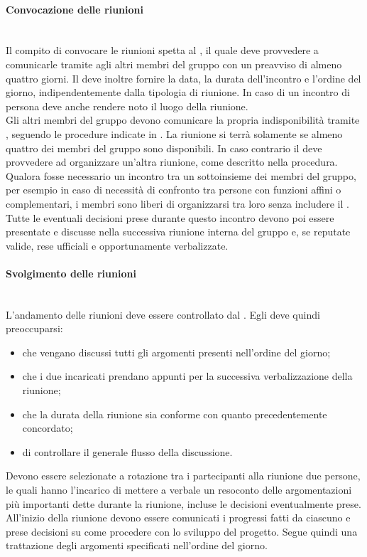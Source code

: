 \paragraph{Convocazione delle riunioni}\mbox{}\\
Il compito di convocare le riunioni spetta al \Responsabile, il quale deve provvedere a comunicarle tramite  agli altri membri del gruppo con un preavviso di almeno quattro giorni. Il \Responsabile{} deve inoltre fornire la data, la durata dell'incontro e l'ordine del giorno, indipendentemente dalla tipologia di riunione. In caso di un incontro di persona deve anche rendere noto il luogo della riunione.\\
Gli altri membri del gruppo devono comunicare la propria indisponibilità tramite , seguendo le procedure indicate in . La riunione si terrà solamente se almeno quattro dei membri del gruppo sono disponibili. In caso contrario il \Responsabile{} deve provvedere ad organizzare un'altra riunione, come descritto nella procedura.\\
Qualora fosse necessario un incontro tra un sottoinsieme dei membri del gruppo, per esempio in caso di necessità di confronto tra persone con funzioni affini o complementari, i membri sono liberi di organizzarsi tra loro senza includere il \Responsabile. Tutte le eventuali decisioni prese durante questo incontro devono poi essere presentate e discusse nella successiva riunione interna del gruppo e, se reputate valide, rese ufficiali e opportunamente verbalizzate.

\paragraph{Svolgimento delle riunioni}\label{sec:svolgimento_riunioni_interne} \mbox{}\\
L'andamento delle riunioni deve essere controllato dal \Responsabile. Egli deve quindi preoccuparsi:

\begin{itemize}
	\item che vengano discussi tutti gli argomenti presenti nell'ordine del giorno;
	\item che i due incaricati prendano appunti per la successiva verbalizzazione della riunione;
	\item che la durata della riunione sia conforme con quanto precedentemente concordato;
	\item di controllare il generale flusso della discussione.
\end{itemize}
Devono essere selezionate a rotazione tra i partecipanti alla riunione due persone, le quali hanno l'incarico di mettere a verbale un resoconto delle argomentazioni più importanti dette durante la riunione, incluse le decisioni eventualmente prese. All'inizio della riunione devono essere comunicati i progressi fatti da ciascuno e prese decisioni su come procedere con lo sviluppo del progetto. Segue quindi una trattazione degli argomenti specificati nell'ordine del giorno. 

